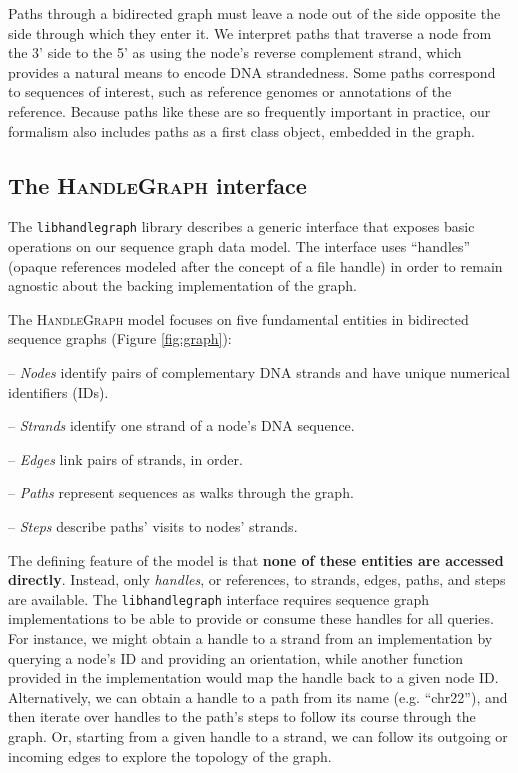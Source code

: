\documentclass{article}
\begin{document}
Paths through a bidirected graph must leave a node out of the side opposite the side through which they enter it.
We interpret paths that traverse a node from the 3' side to the 5' as using the node's reverse complement strand, which provides a natural means to encode DNA strandedness.
Some paths correspond to sequences of interest, such as reference genomes or annotations of the reference.
Because paths like these are so frequently important in practice, our formalism also includes paths as a first class object, embedded in the graph.

\subsection{The \textsc{HandleGraph} interface}

The \texttt{libhandlegraph} library describes a generic interface that exposes basic operations on our sequence graph data model.
The interface uses ``handles'' (opaque references modeled after the concept of a file handle) in order to remain agnostic about the backing implementation of the graph.

The \textsc{HandleGraph} model focuses on five fundamental entities in bidirected sequence graphs (Figure \ref{fig:graph}):

-- \emph{Nodes} identify pairs of complementary DNA strands and have unique numerical identifiers (IDs).

-- \emph{Strands} identify one strand of a node's DNA sequence.

-- \emph{Edges} link pairs of strands, in order.

-- \emph{Paths} represent sequences as walks through the graph.

-- \emph{Steps} describe paths' visits to nodes' strands.

The defining feature of the model is that \textbf{none of these entities are accessed directly}.
Instead, only \emph{handles}, or references, to strands, edges, paths, and steps are available.
The \texttt{libhandlegraph} interface requires sequence graph implementations to be able to provide or consume these handles for all queries.
For instance, we might obtain a handle to a strand from an implementation by querying a node's ID and providing an orientation, while another function provided in the implementation would map the handle back to a given node ID.
Alternatively, we can obtain a handle to a path from its name (e.g. ``chr22''), and then iterate over handles to the path's steps to follow its course through the graph.
Or, starting from a given handle to a strand, we can follow its outgoing or incoming edges to explore the topology of the graph.
\end{document}
